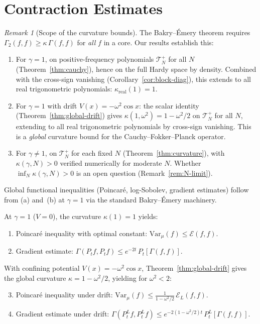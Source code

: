 \documentclass[11pt,a4paper]{article}
\theoremstyle{plain}
\theoremstyle{definition}
\theoremstyle{remark}
\newtheorem{remark}[theorem]{Remark}
\newcommand{\Var}{\mathrm{Var}}
\begin{document}
\section{Contraction Estimates}\label{sec:func-ineq}

\begin{remark}[Scope of the curvature bounds]
\label{rem:scope-curv}
The Bakry--\'Emery theorem requires
$\Gamma_2(f,f) \geq \kappa\,\Gamma(f,f)$ for \emph{all}
$f$ in a core.  Our results establish this:
\begin{enumerate}[label=(\alph*)]
\item For $\gamma = 1$, on positive-frequency polynomials
  $\mathcal{T}_N^+$ for all $N$ (Theorem~\ref{thm:cauchy}),
  hence on the full Hardy space by density.
  Combined with the cross-sign vanishing
  (Corollary~\ref{cor:block-diag}), this extends to
  all real trigonometric polynomials:
  $\kappa_{\mathrm{real}}(1) = 1$.
\item For $\gamma = 1$ with drift $V(x) = -\omega^2\cos x$:
  the scalar identity (Theorem~\ref{thm:global-drift}) gives
  $\kappa(1,\omega^2) = 1 - \omega^2/2$ on $\mathcal{T}_N^+$
  for all $N$, extending to all real trigonometric polynomials
  by cross-sign vanishing.  This is a \emph{global} curvature
  bound for the Cauchy--Fokker--Planck operator.
\item For $\gamma \neq 1$, on $\mathcal{T}_N^+$ for
  each fixed $N$ (Theorem~\ref{thm:curvature}), with
  $\kappa(\gamma,N) > 0$ verified numerically for
  moderate $N$.  Whether $\inf_N \kappa(\gamma,N) > 0$
  is an open question (Remark~\ref{rem:N-limit}).
\end{enumerate}
Global functional inequalities (Poincar\'e, log-Sobolev,
gradient estimates) follow from (a) and~(b) at $\gamma = 1$
via the standard Bakry--\'Emery machinery.
\end{remark}

At $\gamma = 1$ ($V = 0$), the curvature $\kappa(1) = 1$
yields:
\begin{enumerate}[label=(\roman*)]
\item Poincar\'e inequality with optimal constant:
  $\Var_\mu(f) \leq \mathcal{E}(f,f)$.
\item Gradient estimate:
  $\Gamma(P_t f, P_t f) \leq e^{-2t}\,P_t[\Gamma(f,f)]$.
\end{enumerate}

With confining potential $V(x) = -\omega^2\cos x$,
Theorem~\ref{thm:global-drift} gives the global curvature
$\kappa = 1 - \omega^2/2$, yielding for $\omega^2 < 2$:
\begin{enumerate}[label=(\roman*)]
\setcounter{enumi}{2}
\item Poincar\'e inequality under drift:
  $\Var_\mu(f) \leq \frac{1}{1-\omega^2/2}\,\mathcal{E}_L(f,f)$.
\item Gradient estimate under drift:
  $\Gamma(P_t^L f, P_t^L f) \leq
  e^{-2(1-\omega^2/2)t}\,P_t^L[\Gamma(f,f)]$.
\end{enumerate}
\end{document}

